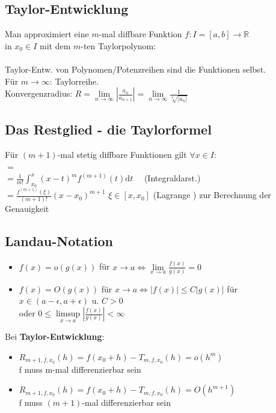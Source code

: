 \documentclass[6pt,a4paper]{scrartcl}
\newcommand{\abs}[1]{\ensuremath{\left\vert#1\right\vert}} 										%
\renewcommand{\emph}[1]{\textbf{#1}}															%
\newcommand{\ra}[0]{\ensuremath{\rightarrow}} 									%
\begin{document}
\begin{multicols}{4}
\section{Taylor-Entwicklung}
Man approximiert eine $m$-mal diffbare Funktion $f:I=[a,b] \rightarrow \mathbb R$ \\ in $x_0 \in I$ mit dem $m$-ten Taylorpolynom:\\
\\
Taylor-Entw. von Polynomen/Potenzreihen sind die Funktionen selbst.\\
Für $m \ra \infty$: Taylorreihe. \\
Konvergenzradius: $R = \underset{n\rightarrow \infty}{\lim} \abs{\frac{a_n}{a_{n+1}}}=\lim\limits_{n\rightarrow \infty}\frac{1}{\sqrt[n]{\abs{a_n}}}$

	\subsection{Das Restglied - die Taylorformel}
	Für $(m+1)$-mal stetig diffbare Funktionen gilt $\forall x \in I:$\\
	 $=$ \\
	$= \frac{1}{m!} \int_{x_0}^{x}(x-t)^m f^{(m+1)}(t)\mathrm dt$ \ \  (Integraldarst.)\\
	$= \frac{f^{(m+1)}(\xi)}{(m+1)!}(x-x_0)^{m+1}$ \quad
	$\xi \in [x, x_0]$ (Lagrange ) zur Berechnung der Genauigkeit\\
	
	\subsection{Landau-Notation}
	\begin{itemize}\itemsep-1pt
		\item $f(x) = o(g(x))$ für $x \rightarrow a \Leftrightarrow \lim\limits_{x \rightarrow a} \frac{f(x)}{g(x)} = 0$
		\item $f(x) = O(g(x))$ für $x \rightarrow a \Leftrightarrow |f(x)| \leq C|g(x)|$ für $x \in (a - \epsilon, a + \epsilon)$ u. $C > 0$\\ oder $0 \leq \limsup\limits_{x \rightarrow a} \abs{\frac{f(x)}{g(x)}} < \infty$
	\end{itemize}
	Bei \emph{Taylor-Entwicklung}:
	\begin{itemize}\itemsep-1pt
		\item $R_{m+1,f,x_0}(h) = f(x_0 + h) - T_{m,f,x_0}(h) = o(h^m)$\\ f muss m-mal differenzierbar sein
		\item $R_{m+1,f,x_0}(h) = f(x_0 + h) - T_{m,f,x_0}(h) = O(h^{m+1})$\\ f muss $(m+1)$-mal differenzierbar sein
	\end{itemize}

\end{multicols}
\end{document}
